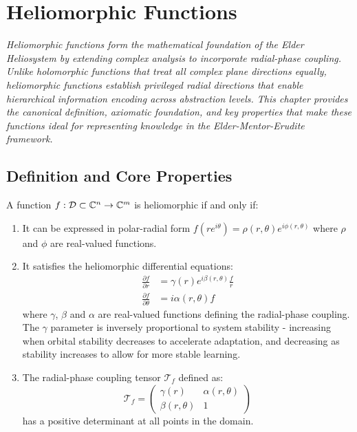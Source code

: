 \chapter{Heliomorphic Functions}

\textit{Heliomorphic functions form the mathematical foundation of the Elder Heliosystem by extending complex analysis to incorporate radial-phase coupling. Unlike holomorphic functions that treat all complex plane directions equally, heliomorphic functions establish privileged radial directions that enable hierarchical information encoding across abstraction levels. This chapter provides the canonical definition, axiomatic foundation, and key properties that make these functions ideal for representing knowledge in the Elder-Mentor-Erudite framework.}

\section{Definition and Core Properties}

\begin{definition}
A function $f: \mathcal{D} \subset \mathbb{C}^n \rightarrow \mathbb{C}^m$ is heliomorphic if and only if:
\begin{enumerate}
    \item It can be expressed in polar-radial form $f(re^{i\theta}) = \rho(r,\theta)e^{i\phi(r,\theta)}$ where $\rho$ and $\phi$ are real-valued functions.
    
    \item It satisfies the heliomorphic differential equations:
    \begin{align}
        \frac{\partial f}{\partial r} &= \gamma(r)e^{i\beta(r,\theta)}\frac{f}{r}\\
        \frac{\partial f}{\partial \theta} &= i\alpha(r,\theta)f
    \end{align}
    where $\gamma$, $\beta$ and $\alpha$ are real-valued functions defining the radial-phase coupling. The $\gamma$ parameter is inversely proportional to system stability - increasing when orbital stability decreases to accelerate adaptation, and decreasing as stability increases to allow for more stable learning.
    
    \item The radial-phase coupling tensor $\mathcal{T}_f$ defined as:
    \begin{equation}
        \mathcal{T}_f = \begin{pmatrix}
            \gamma(r) & \alpha(r,\theta)\\
            \beta(r,\theta) & 1
        \end{pmatrix}
    \end{equation}
    has a positive determinant at all points in the domain.
\end{enumerate}
\end{definition}


